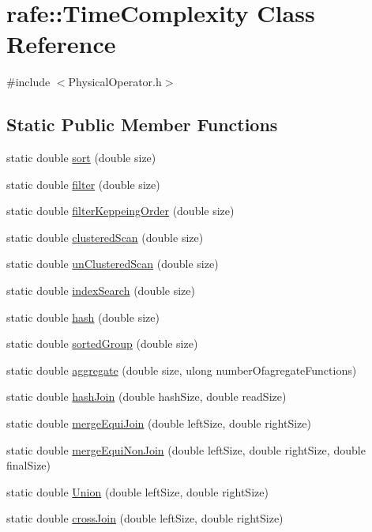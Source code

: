 \hypertarget{classrafe_1_1_time_complexity}{\section{rafe\+:\+:Time\+Complexity Class Reference}
\label{classrafe_1_1_time_complexity}
}


{\ttfamily \#include $<$Physical\+Operator.\+h$>$}

\subsection*{Static Public Member Functions}
\begin{DoxyCompactItemize}
\item 
static double \hyperlink{classrafe_1_1_time_complexity_a92e530c62d1ea5131658ad8b75ce269c}{sort} (double size)
\item 
static double \hyperlink{classrafe_1_1_time_complexity_a213521a1bd8902f5a6bafd8272444b69}{filter} (double size)
\item 
static double \hyperlink{classrafe_1_1_time_complexity_a8e1059138aa9347020503e3efaaf1d2e}{filter\+Keppeing\+Order} (double size)
\item 
static double \hyperlink{classrafe_1_1_time_complexity_a13baf21bbf65cb0eaba96da279794747}{clustered\+Scan} (double size)
\item 
static double \hyperlink{classrafe_1_1_time_complexity_ac1a90dbd5e6bc85cf86cc068163be63d}{un\+Clustered\+Scan} (double size)
\item 
static double \hyperlink{classrafe_1_1_time_complexity_a6a18620dfff08ab4c5e917ec8f2e1cc3}{index\+Search} (double size)
\item 
static double \hyperlink{classrafe_1_1_time_complexity_aa7bd60f08b00b9a7f63f0ee6f3c17443}{hash} (double size)
\item 
static double \hyperlink{classrafe_1_1_time_complexity_a2d5b4abf7cb451d1bad4495228b407e7}{sorted\+Group} (double size)
\item 
static double \hyperlink{classrafe_1_1_time_complexity_addebc0edb7658eff5e4ddb8624339277}{aggregate} (double size, ulong number\+Ofagregate\+Functions)
\item 
static double \hyperlink{classrafe_1_1_time_complexity_a141b78f3bc3303bc16c25a052d86c7ab}{hash\+Join} (double hash\+Size, double read\+Size)
\item 
static double \hyperlink{classrafe_1_1_time_complexity_a8cf14789777cd6cd1cd1a982613d6250}{merge\+Equi\+Join} (double left\+Size, double right\+Size)
\item 
static double \hyperlink{classrafe_1_1_time_complexity_a9c03ff5156a8f8c2c9f6102d6099a5aa}{merge\+Equi\+Non\+Join} (double left\+Size, double right\+Size, double final\+Size)
\item 
static double \hyperlink{classrafe_1_1_time_complexity_a1c726c82563a19dc05320c2c9fd9895f}{Union} (double left\+Size, double right\+Size)
\item 
static double \hyperlink{classrafe_1_1_time_complexity_a5737c1cc857b5c74a6598e1f87b6ca83}{cross\+Join} (double left\+Size, double right\+Size)
\end{DoxyCompactItemize}
